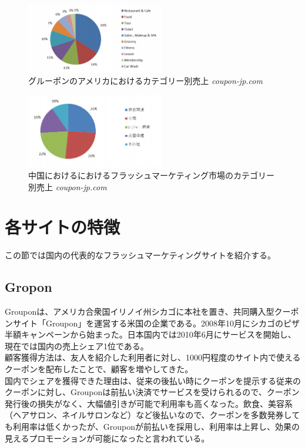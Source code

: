 \begin{figure}[htbp]
	\centering
	\includegraphics[width=6cm, bb=0 0 330 272]{figures/gus.jpg}
	\caption{グルーポンのアメリカにおけるカテゴリー別売上 {\itshape coupon-jp.com}}
	\label{グルーポンのアメリカにおけるカテゴリー別売上}
\end{figure}

\begin{figure}[htbp]
	\centering
	\includegraphics[width=6cm, bb=0 0 330 272]{figures/gc.jpg}
	\caption{中国におけるにおけるフラッシュマーケティング市場のカテゴリー別売上 {\itshape coupon-jp.com}}
	\label{中国におけるにおけるフラッシュマーケティング市場のカテゴリー別売上}
\end{figure}
\section{各サイトの特徴}
この節では国内の代表的なフラッシュマーケティングサイトを紹介する。
\subsection{Gropon}
Grouponは、アメリカ合衆国イリノイ州シカゴに本社を置き、共同購入型クーポンサイト「Groupon」を運営する米国の企業である。2008年10月にシカゴのピザ半額キャンペーンから始まった。日本国内では2010年6月にサービスを開始し、現在では国内の売上シェア1位である。
\\顧客獲得方法は、友人を紹介した利用者に対し、1000円程度のサイト内で使えるクーポンを配布したことで、顧客を増やしてきた。
\\国内でシェアを獲得できた理由は、従来の後払い時にクーポンを提示する従来のクーポンに対し、Grouponは前払い決済でサービスを受けられるので、クーポン発行後の損失がなく、大幅値引きが可能で利用率も高くなった。飲食、美容系（ヘアサロン、ネイルサロンなど）など後払いなので、クーポンを多数発券しても利用率は低くかったが、Grouponが前払いを採用し、利用率は上昇し、効果の見えるプロモーションが可能になったと言われている。
